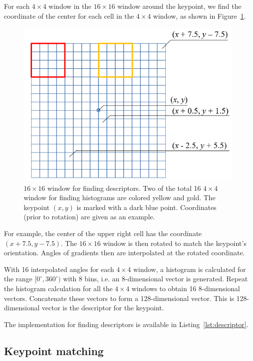 \documentclass{ee208report}
\begin{document}
\begin{multicols*}{2}
For each $4 \times 4$ window in the $16 \times 16$ window around the keypoint,
we find the coordinate of the center for each cell in the $4 \times 4$ window,
as shown in Figure~\ref{fig:descriptor-window}.

\begin{figure}[H]
    \includegraphics[width=\linewidth]{images/descriptor_window.png}
    \caption{$16 \times 16$ window for finding descriptors. Two of the total 16
        $4 \times 4$ window for finding histograms are colored yellow and gold.
        The keypoint $(x, y)$ is marked with a dark blue point. Coordinates
        (prior to rotation) are given as an example.}
    \label{fig:descriptor-window}
\end{figure}

For example, the center of the upper right cell has the coordinate $(x + 7.5, y
- 7.5)$. The $16 \times 16$ window is then rotated to match the keypoint's
orientation. Angles of gradients then are interpolated at the rotated
coordinate.

With 16 interpolated angles for each $4 \times 4$ window, a histogram is
calculated for the range $[0^\circ, 360^\circ)$ with 8 bins, i.e. an
8-dimensional vector is generated. Repeat the histogram calculation for all the
$4 \times 4$ windows to obtain 16 8-dimensional vectors. Concatenate these
vectors to form a 128-dimensional vector. This is 128-dimensional vector is the
descriptor for the keypoint.

The implementation for finding descriptors is available in Listing~\ref{lst:descriptor}.

\subsection{Keypoint matching}


\end{multicols*}
\end{document}
